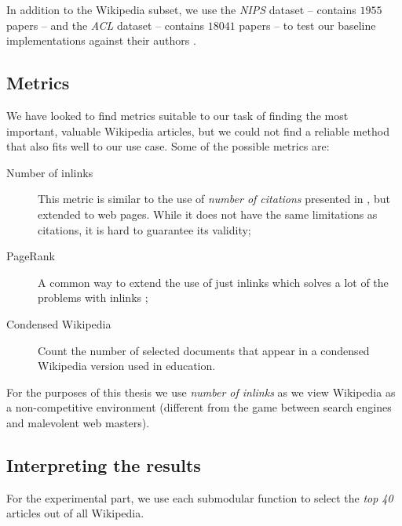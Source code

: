 In addition to the Wikipedia subset, we use the \emph{\acf{NIPS}} dataset --
contains \(1955\) papers -- and the \emph{\acf{ACL}} dataset -- contains
\(18041\) papers -- to test our baseline implementations against their authors
\cite{sipos2012temporal}.

\subsection{Metrics}

We have looked to find metrics suitable to our task of finding the most
important, valuable Wikipedia articles, but we could not find a reliable method
that also fits well to our use case.
Some of the possible metrics are:
\begin{description}
  \item[Number of inlinks] This metric is similar to the use of \emph{number of
  citations} presented in \cite{sipos2012temporal}, but extended to web pages.
  While it does not have the same limitations as citations, it is hard to
  guarantee its validity;
  \item[PageRank] A common way to extend the use of just inlinks which solves a
  lot of the problems with inlinks \cite{page1999pagerank};
  \item[Condensed Wikipedia] Count the number of selected documents that appear
  in a condensed Wikipedia version used in education.
\end{description}

For the purposes of this thesis we use \emph{number of inlinks} as we view
Wikipedia as a non-competitive environment (different from the game between
search engines and malevolent web masters).

\subsection{Interpreting the results}

For the experimental part, we use each submodular function to select the
\emph{top 40} articles out of all Wikipedia.

